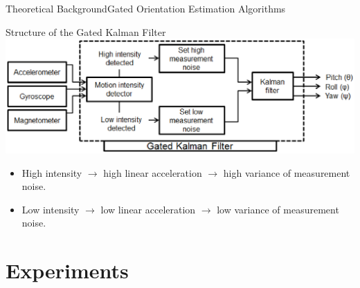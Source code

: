 \documentclass[10pt,aspectratio=1610]{beamer}
\begin{document}
\begin{frame}{Theoretical Background}{Gated Orientation Estimation Algorithms}
\begin{block}{Structure of the Gated Kalman Filter}
\vspace{0.3cm}
\centering
\includegraphics[width=1\textwidth]{AAUgraphics/GKFDiagram.eps}
\begin{itemize}
	\item High intensity $\rightarrow$ high linear acceleration $\rightarrow$ high variance of measurement noise.
	\item Low intensity $\rightarrow$ low linear acceleration $\rightarrow$ low variance of measurement noise.
\end{itemize}
\end{block}
\end{frame}


\section{Experiments}
\label{sec:experiments}
\end{document}
